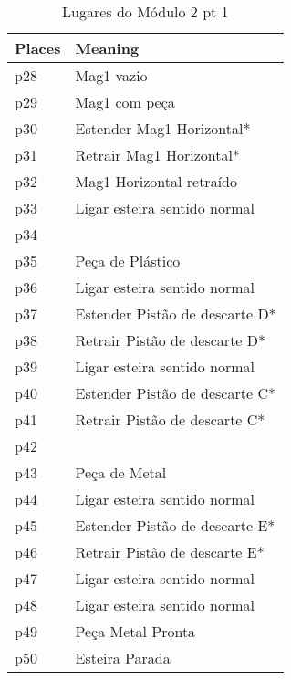 \begin{table}[htbp]
\caption{Lugares do Módulo 2 pt 1}
\centering
\begin{tabular}{ll}
Places & Meaning\\
\hline
p28 & Mag1 vazio\\
p29 & Mag1 com peça\\
p30 & Estender Mag1 Horizontal*\\
p31 & Retrair Mag1 Horizontal*\\
p32 & Mag1 Horizontal retraído\\
p33 & Ligar esteira sentido normal\\
p34 & \\
p35 & Peça de Plástico\\
p36 & Ligar esteira sentido normal\\
p37 & Estender Pistão de descarte D*\\
p38 & Retrair Pistão de descarte D*\\
p39 & Ligar esteira sentido normal\\
p40 & Estender Pistão de descarte C*\\
p41 & Retrair Pistão de descarte C*\\
p42 & \\
p43 & Peça de Metal\\
p44 & Ligar esteira sentido normal\\
p45 & Estender Pistão de descarte E*\\
p46 & Retrair Pistão de descarte E*\\
p47 & Ligar esteira sentido normal\\
p48 & Ligar esteira sentido normal\\
p49 & Peça Metal Pronta\\
p50 & Esteira Parada\\
\end{tabular}
\end{table}


